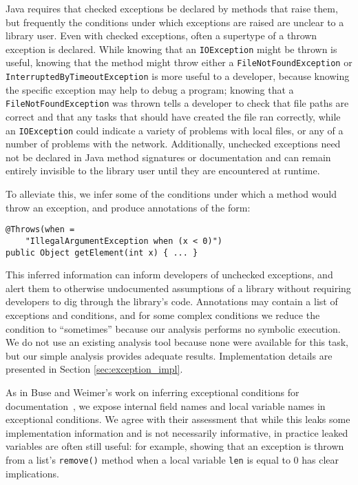 Java requires that checked exceptions be declared by methods that raise them,
but frequently the conditions under which exceptions are raised are unclear to a
library user. Even with checked exceptions, often a supertype of a thrown
exception is declared.  While knowing that an \texttt{IOException} might be
thrown is useful, knowing that the method might throw either a
\texttt{FileNotFoundException} or \texttt{InterruptedByTimeoutException} is more
useful to a developer, because knowing the specific exception may help to debug
a program; knowing that a \texttt{FileNotFoundException} was thrown tells a
developer to check that file paths are correct and that any tasks that should
have created the file ran correctly, while an \texttt{IOException} could
indicate a variety of problems with local files, or any of a number of problems
with the network.  Additionally, unchecked exceptions need not be declared in Java method
signatures or documentation and can remain entirely invisible to the library
user until they are encountered at runtime.

To alleviate this, we infer some of the conditions under which a method would
throw an exception, and produce annotations of the form:

\begin{verbatim}
@Throws(when =
    "IllegalArgumentException when (x < 0)")
public Object getElement(int x) { ... }
\end{verbatim}

This inferred information can inform developers of unchecked exceptions,
and alert them to otherwise undocumented assumptions of a library without
requiring developers to dig through the library's code.
Annotations may contain a list of exceptions and conditions, and for some
complex conditions we reduce the condition to ``sometimes'' because our analysis
performs no symbolic execution.  We do not use an
existing analysis tool because none were available for this task, but our
simple analysis provides adequate results.  Implementation details are presented
in Section \ref{sec:exception_impl}.

As in Buse and Weimer's work on inferring exceptional conditions for
documentation~\cite{autodoc}, we expose internal field names and
local variable names in exceptional conditions.  We agree with their assessment
that while this leaks some
implementation information and is not necessarily informative, in practice
leaked variables are often still useful: for example, showing that an exception is
thrown from a list's \texttt{remove()} method when a local variable \texttt{len}
is equal to 0 has clear implications.

